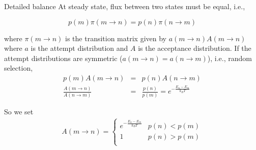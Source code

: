 \documentclass[aspectratio=169]{beamer}
\begin{document}
    \begin{frame}{Detailed balance}
        At steady state, flux between two states must be equal, i.e.,

        \begin{equation*}
            p(m) \pi(m \rightarrow n) = p(n) \pi(n \rightarrow m)
        \end{equation*}

        where $\pi(m \rightarrow n)$ is the transition matrix given by $a(m \rightarrow n)A(m \rightarrow n)$ where $a$ is the attempt distribution and $A$ is the acceptance distribution. If the attempt distributions are symmetric ($a(m \rightarrow n) = a(n \rightarrow m)$), i.e., random selection,
        \begin{eqnarray*}
            p(m) A(m \rightarrow n) & = & p(n) A(n \rightarrow m)\\
            \frac{A(m \rightarrow n)}{A(n \rightarrow m)} & = & \frac{p(n)}{p(m)} = e^{-\frac{E_n - E_m}{k_BT}}
        \end{eqnarray*}

        So we set
        \begin{eqnarray*}
            A(m \rightarrow n) = \begin{cases}
                                     e^{-\frac{E_n - E_m}{k_BT}} &p(n) < p(m)\\
                                     1 & p(n) > p(m)\\
            \end{cases}
        \end{eqnarray*}

    \end{frame}
\end{document}
